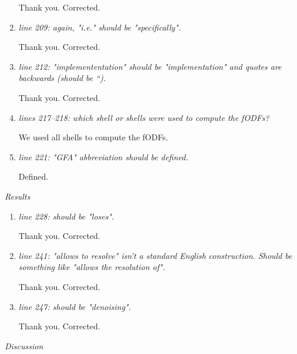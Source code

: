 \documentclass[a4paper,11pt,twoside]{report}
\begin{document}
\begin{enumerate}[resume]
    \hspace{1em} Thank you. Corrected.

    \item \textit{line 209: again, "i.e." should be "specifically".}

    \hspace{1em} Thank you. Corrected.

    \item \textit{line 212: "implemententation" should be "implementation" and quotes are backwards (should be ``).}

    \hspace{1em} Thank you. Corrected.

    \item \textit{lines 217--218: which shell or shells were used to compute the fODFs?}

    \hspace{1em} We used all shells to compute the fODFs.

    \item \textit{line 221: "GFA" abbreviation should be defined.}

    \hspace{1em} Defined.

\end{enumerate}


\noindent \textit{Results}

\begin{enumerate}[resume]
    \item \textit{line 228: should be "loses".}

    \hspace{1em} Thank you. Corrected.

    \item \textit{line 241: "allows to resolve" isn't a standard English construction. Should be something like "allows the resolution of".}

    \hspace{1em} Thank you. Corrected.

    \item \textit{line 247: should be "denoising".}

    \hspace{1em} Thank you. Corrected.

\end{enumerate}

\noindent \textit{Discussion}
\end{document}
